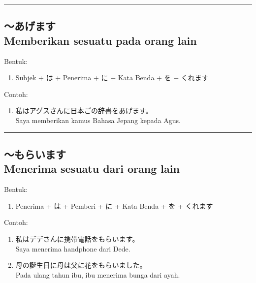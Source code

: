 \vspace{0.2cm}\hrule height 1pt\vspace{0.2cm}


\subsection*{
    ～あげます \\
    Memberikan sesuatu pada orang lain
}
Bentuk:
\begin{enumerate}
    \item Subjek + は + Penerima + に + Kata Benda + を + くれます
\end{enumerate}
Contoh: 
\begin{enumerate}
    \item 私はアグスさんに日本ごの辞書をあげます。
    \\ Saya memberikan kamus Bahasa Jepang kepada Agus.
\end{enumerate}

\vspace{0.2cm}\hrule height 1pt\vspace{0.2cm}

\newpage
\subsection*{
    ～もらいます \\
    Menerima sesuatu dari orang lain
}
Bentuk:
\begin{enumerate}
    \item Penerima + は + Pemberi + に + Kata Benda + を + くれます
\end{enumerate}
Contoh: 
\begin{enumerate}
    \item 私はデデさんに携帯電話をもらいます。
    \\ Saya menerima handphone dari Dede.
    \item 母の誕生日に母は父に花をもらいました。
    \\ Pada ulang tahun ibu, ibu menerima bunga dari ayah.
\end{enumerate}

